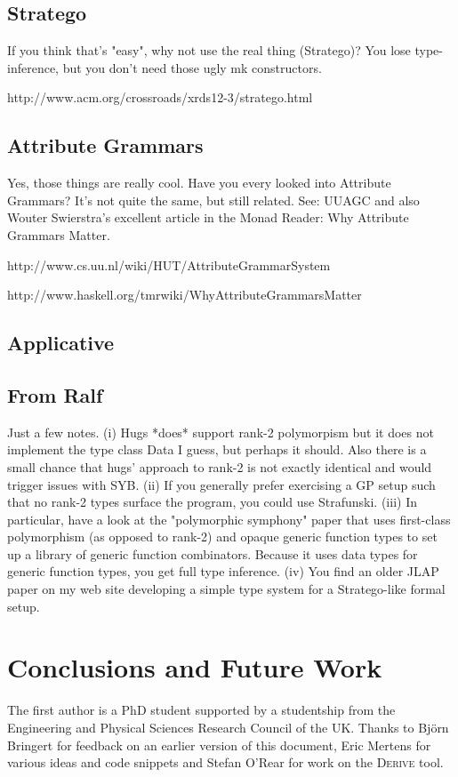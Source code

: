 \documentclass[preprint]{sigplanconf}
\begin{document}
\subsection{Stratego}

If you think that's "easy", why not use the real thing (Stratego)? You lose type-inference, but you don't need those ugly mk constructors.

http://www.acm.org/crossroads/xrds12-3/stratego.html

\subsection{Attribute Grammars}

Yes, those things are really cool. Have you every looked into Attribute Grammars? It's not quite the same, but still related. See: UUAGC and also Wouter Swierstra's excellent article in the Monad Reader: Why Attribute Grammars Matter.

http://www.cs.uu.nl/wiki/HUT/AttributeGrammarSystem

http://www.haskell.org/tmrwiki/WhyAttributeGrammarsMatter

\subsection{Applicative}

\subsection{From Ralf}

Just a few notes. (i) Hugs *does* support rank-2 polymorpism but it does not implement the type class Data I guess, but perhaps it should. Also there is a small chance that hugs' approach to rank-2 is not exactly identical and would trigger issues with SYB. (ii) If you generally prefer exercising a GP setup such that no rank-2 types surface the program, you could use Strafunski. (iii) In particular, have a look at the "polymorphic symphony" paper that uses first-class polymorphism (as opposed to rank-2) and opaque generic function types to set up a library of generic function combinators. Because it uses data types for generic function types, you get full type inference. (iv) You find an older JLAP paper on my web site developing a simple type system for a Stratego-like formal setup.

\section{Conclusions and Future Work}
\label{sec:conclusion}

\acks

The first author is a PhD student supported by a studentship from the Engineering and Physical Sciences Research Council of the UK. Thanks to Bj\"{o}rn Bringert for feedback on an earlier version of this document, Eric Mertens for various ideas and code snippets and Stefan O'Rear for work on the \textsc{Derive} tool.



\end{document}
